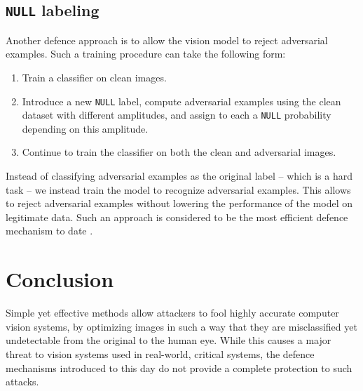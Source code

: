 \documentclass[twocolumn]{../cs-classes/cs-classes}
\begin{document}
\subsection{\texorpdfstring{\texttt{NULL}}{NULL} labeling}
Another defence approach is to allow the vision model to reject adversarial examples. Such a training procedure can take the following form:
\begin{enumerate}
    \item Train a classifier on clean images.
    \item Introduce a new \texttt{NULL} label, compute adversarial examples using the clean dataset with different amplitudes, and assign to each a \texttt{NULL} probability depending on this amplitude.
    \item Continue to train the classifier on both the clean and adversarial images.
\end{enumerate}
Instead of classifying adversarial examples as the original label -- which is a hard task -- we instead train the model to recognize adversarial examples. This allows to reject adversarial examples without lowering the performance of the model on legitimate data. Such an approach is considered to be the most efficient defence mechanism to date \cite{chakraborty2021survey}.

\section{Conclusion}
Simple yet effective methods allow attackers to fool highly accurate computer vision systems, by optimizing images in such a way that they are misclassified yet undetectable from the original to the human eye. While this causes a major threat to vision systems used in real-world, critical systems, the defence mechanisms introduced to this day do not provide a complete protection to such attacks.

\nocite{*}
\printbibliography
\end{document}
